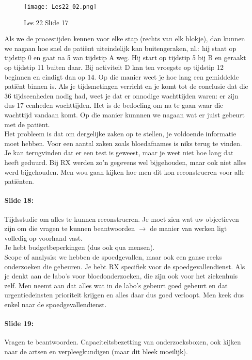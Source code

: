\documentclass[10pt,a4paper]{report}
\begin{document}
\begin{figure}[h!]
\centering
\texttt{[image: Les22\_02.png]}
\caption{Les 22 Slide 17} 
\label{les22_02}
\end{figure}

Als we de procestijden kennen voor elke stap (rechts van elk blokje), dan kunnen we nagaan hoe snel de pati\"ent uiteindelijk kan buitengeraken, nl.: hij staat op tijdstip 0 en gaat na 5 van tijdstip A weg. Hij start op tijdstip 5 bij B en geraakt op tijdstip 11 buiten daar. Bij activiteit D kan ten vroegste op tijdstip 12 beginnen en eindigt dan op 14. Op die manier weet je hoe lang een gemiddelde pati\"ent binnen is. Als je tijdsmetingen verricht en je komt tot de conclusie dat die 36 tijdseenheden nodig had, weet je dat er onnodige wachttijden waren: er zijn dus 17 eenheden wachttijden. Het is de bedoeling om na te gaan waar die wachttijd vandaan komt. Op die manier kunnnen we nagaan wat er juist gebeurt met de pati\"ent.\\
Het probleem is dat om dergelijke zaken op te stellen, je voldoende informatie moet hebben. Voor een aantal zaken zoals bloedafnames is niks terug te vinden. Je kan terugvinden dat er een test is geweest, maar je weet niet hoe lang dat heeft geduurd. Bij RX werden zo'n gegevens wel bijgehouden, maar ook niet alles werd bijgehouden. Men wou gaan kijken hoe men dit kon reconstrueren voor alle pati\"enten.

\paragraph{Slide 18:} Tijdsstudie om alles te kunnen reconstrueren. Je moet zien wat uw objectieven zijn om die vragen te kunnen beantwoorden $\rightarrow$ de manier van werken ligt volledig op voorhand vast. \\
Je hebt budgetbeperkingen (dus ook qua mensen).\\
Scope of analysis: we hebben de spoedgevallen, maar ook een ganse reeks onderzoeken die gebeuren. Je hebt RX specifiek voor de spoedgevallendienst. Als je denkt aan de labo's voor bloedonderzoeken, die zijn ook voor het ziekenhuis zelf. Men neemt aan dat alles wat in de labo's gebeurt goed gebeurt en dat urgentiedeinsten prioriteit krijgen en alles daar dus goed verloopt. Men keek dus enkel naar de spoedgevallendienst.

\paragraph{Slide 19:} Vragen te beantwoorden. Capaciteitsbezetting van onderzoeksboxen, ook kijken naar de artsen en verpleegkundigen (maar dit bleek moeilijk).
\end{document}
